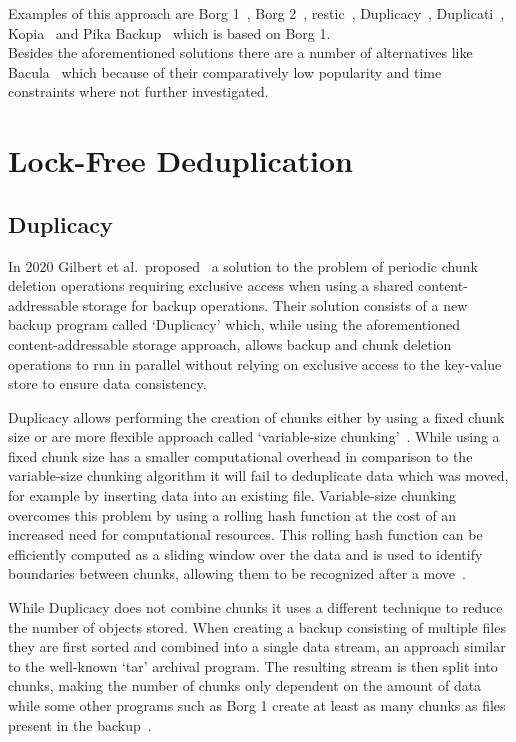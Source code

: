 Examples of this approach are Borg 1~\cite{Borg1}, Borg 2~\cite{Borg2}, restic~\cite{restic},
Duplicacy~\cite{Duplicacy}, Duplicati~\cite{Duplicati}, Kopia~\cite{Kopia} and
Pika Backup~\cite{Pika} which is based on Borg 1. \\

Besides the aforementioned solutions there are a number of
alternatives like Bacula~\cite{Bacula} which because of their comparatively low
popularity and time constraints where not further investigated.

\section{Lock-Free Deduplication}

\subsection{Duplicacy}

In 2020 Gilbert et al.\ proposed~\cite{Duplicacy} a solution to
the problem of periodic chunk deletion operations requiring exclusive access when
using a shared content-addressable storage for backup operations.
Their solution consists of a new backup program called `Duplicacy' which, while
using the aforementioned content-addressable storage approach, allows backup
and chunk deletion operations to run in parallel without relying on exclusive
access to the key-value store to ensure data consistency.

Duplicacy allows performing the creation of chunks either by using a fixed chunk size
or are more flexible approach called
`variable-size chunking'~\cite[section `Incremental Backup and Full Snapshot']{Duplicacy}.
While using a fixed chunk size has a smaller computational overhead in comparison
to the variable-size chunking algorithm it will fail to deduplicate data which was
moved, for example by inserting data into an existing file.
Variable-size chunking overcomes this problem by using a rolling hash function at the
cost of an increased need for computational resources.
This rolling hash function can be efficiently computed as a sliding window over the data
and is used to identify boundaries between chunks, allowing them to be recognized
after a move~\cite[section `Chunking']{Duplicacy}.

While Duplicacy does not combine chunks it uses a different technique to reduce the
number of objects stored.
When creating a backup consisting of multiple files they are first sorted and
combined into a single data stream, an approach similar to the well-known
`tar' archival program.
The resulting stream is then split into chunks, making the number of chunks
only dependent on the amount of data~\cite[section `Naming Chunks']{Duplicacy}
while some other programs such as Borg 1 create at least as many chunks as files
present in the backup~\cite[section `Internals']{Borg1}.

